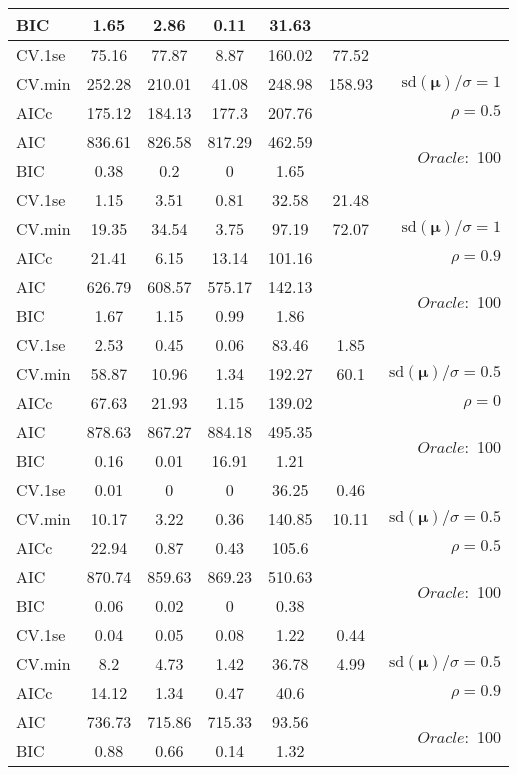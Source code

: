 \begin{table}
\begin{center}
\begin{tabular}{l*{5}{c}|r}
BIC & 1.65 & 2.86 & 0.11 & 31.63 & &  \\
 \hline 
CV.1se & 75.16 & 77.87 & 8.87 & 160.02 & 77.52 & \\
CV.min & 252.28 & 210.01 & 41.08 & 248.98 & 158.93 &  $\mathrm{sd}(\mathbf{\mu})/\sigma=1$ \\
AICc & 175.12 & 184.13 & 177.3 & 207.76 & & $\rho=0.5$ \\
AIC & 836.61 & 826.58 & 817.29 & 462.59 & &  \multirow{2}{*}{$Oracle: $ 100} \\
BIC & 0.38 & 0.2 & 0 & 1.65 & &  \\
 \hline 
CV.1se & 1.15 & 3.51 & 0.81 & 32.58 & 21.48 & \\
CV.min & 19.35 & 34.54 & 3.75 & 97.19 & 72.07 &  $\mathrm{sd}(\mathbf{\mu})/\sigma=1$ \\
AICc & 21.41 & 6.15 & 13.14 & 101.16 & & $\rho=0.9$ \\
AIC & 626.79 & 608.57 & 575.17 & 142.13 & &  \multirow{2}{*}{$Oracle: $ 100} \\
BIC & 1.67 & 1.15 & 0.99 & 1.86 & &  \\
 \hline 
CV.1se & 2.53 & 0.45 & 0.06 & 83.46 & 1.85 & \\
CV.min & 58.87 & 10.96 & 1.34 & 192.27 & 60.1 &  $\mathrm{sd}(\mathbf{\mu})/\sigma=0.5$ \\
AICc & 67.63 & 21.93 & 1.15 & 139.02 & & $\rho=0$ \\
AIC & 878.63 & 867.27 & 884.18 & 495.35 & &  \multirow{2}{*}{$Oracle: $ 100} \\
BIC & 0.16 & 0.01 & 16.91 & 1.21 & &  \\
 \hline 
CV.1se & 0.01 & 0 & 0 & 36.25 & 0.46 & \\
CV.min & 10.17 & 3.22 & 0.36 & 140.85 & 10.11 &  $\mathrm{sd}(\mathbf{\mu})/\sigma=0.5$ \\
AICc & 22.94 & 0.87 & 0.43 & 105.6 & & $\rho=0.5$ \\
AIC & 870.74 & 859.63 & 869.23 & 510.63 & &  \multirow{2}{*}{$Oracle: $ 100} \\
BIC & 0.06 & 0.02 & 0 & 0.38 & &  \\
 \hline 
CV.1se & 0.04 & 0.05 & 0.08 & 1.22 & 0.44 & \\
CV.min & 8.2 & 4.73 & 1.42 & 36.78 & 4.99 &  $\mathrm{sd}(\mathbf{\mu})/\sigma=0.5$ \\
AICc & 14.12 & 1.34 & 0.47 & 40.6 & & $\rho=0.9$ \\
AIC & 736.73 & 715.86 & 715.33 & 93.56 & &  \multirow{2}{*}{$Oracle: $ 100} \\
BIC & 0.88 & 0.66 & 0.14 & 1.32 & &  \\
 \hline 
\end{tabular}
\end{center}
\vspace{-1cm}
\end{table}




